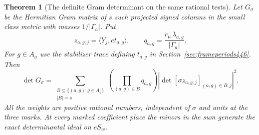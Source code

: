 \documentclass[a4paper,11pt]{article}
\newtheorem{theorem}[proposition]{Theorem}
\theoremstyle{definition}
\theoremstyle{remark}
\numberwithin{equation}{section}
\begin{document}
\begin{theorem}[The definite Gram determinant on the same rational tests]\leavevmode
\label{thm:commoncompactgram447}
Let \(G_\sigma\) be the Hermitian Gram matrix of \(s\) such projected
signed columns in the small class metric with masses
\(1/|\Gamma_a|\). Put
\[
  z_{a,g;j}=\langle Y_j,e t_{a,g}\rangle,\qquad
  q_{a,g}=\frac{r_\mu\,\lambda_{a,g}}{|\Gamma_a|}.
\]
For \(g\in A_a\) use the stabilizer trace defining \(t_{a,g}\)
in Section~\ref{sec:frameperiods446}. Then
\[
    \det G_\sigma=
       \sum_{\substack{B\subseteq\{(a,g):g\in A_a\}\\ |B|=s}}
        \left(\prod_{(a,g)\in B}q_{a,g}\right)
        \left|\det[\sigma z_{a,g;j}]_{(a,g)\in B,j}\right|^2 .
\]
All the weights are positive rational numbers, independent of
\(\sigma\) and units at the three marks. At every marked coefficient
place the minors in the sum generate the exact determinantal ideal
on \(eS_w\).
\end{theorem}
\end{document}
